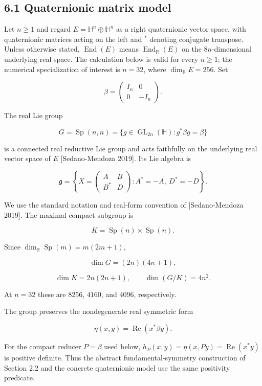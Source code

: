 \documentclass[
  10pt,
  letterpaper,
  oneside]{scrartcl}
\begin{document}
\subsection{6.1 Quaternionic matrix
model}\label{quaternionic-matrix-model}

Let \(n\geq1\) and regard \(E=\mathbb H^n\oplus\mathbb H^n\) as a right
quaternionic vector space, with quaternionic matrices acting on the left
and \(^*\) denoting conjugate transpose. Unless otherwise stated,
\(\operatorname{End}(E)\) means \(\operatorname{End}_{\mathbb R}(E)\) on
the \(8n\)-dimensional underlying real space. The calculation below is
valid for every \(n\geq1\); the numerical specialization of interest is
\(n=32\), where \(\dim_{\mathbb R}E=256\). Set

\[
\beta=
\begin{pmatrix}
I_n&0\\
0&-I_n
\end{pmatrix}.
\]

The real Lie group

\[
G=\operatorname{Sp}(n,n)
=\{g\in\operatorname{GL}_{2n}(\mathbb H):g^*\beta g=\beta\}
\]

is a connected real reductive Lie group and acts faithfully on the
underlying real vector space of \(E\) {[}Sedano-Mendoza 2019{]}. Its Lie
algebra is

\[
\mathfrak g=
\left\{
X=
\begin{pmatrix}
A&B\\
B^*&D
\end{pmatrix}
:
A^*=-A,\ D^*=-D
\right\}.
\]

We use the standard notation and real-form convention of
{[}Sedano-Mendoza 2019{]}. The maximal compact subgroup is

\[
K=\operatorname{Sp}(n)\times\operatorname{Sp}(n).
\]

Since \(\dim_{\mathbb R}\operatorname{Sp}(m)=m(2m+1)\),

\[
\dim G=(2n)(4n+1),
\]

\[
\dim K=2n(2n+1),
\qquad
\dim(G/K)=4n^2.
\]

At \(n=32\) these are \(8256\), \(4160\), and \(4096\), respectively.

The group preserves the nondegenerate real symmetric form

\[
\eta(x,y)=\operatorname{Re}(x^*\beta y).
\]

For the compact reducer \(P=\beta\) used below,
\(h_P(x,y)=\eta(x,Py)=\operatorname{Re}(x^*y)\) is positive definite.
Thus the abstract fundamental-symmetry construction of Section 2.2 and
the concrete quaternionic model use the same positivity predicate.
\end{document}
